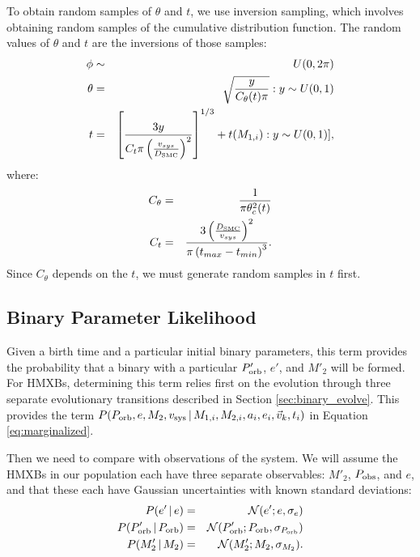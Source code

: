 \documentclass[usenatbib]{mnras}
\newcommand{\given}{\,|\,}
\begin{document}
 To obtain random samples of $\theta$ and $t$, we use inversion sampling, which involves obtaining random samples of the cumulative distribution function. The random values of $\theta$ and $t$ are the inversions of those samples:
 \begin{eqnarray}
\phi &\sim& U(0, 2\pi) \\
\theta &=& \sqrt{\frac{y}{C_{\theta}(t) \pi}}: y \sim U(0,1) \\
t &=& \left[ \frac{3y}{C_t \pi \left( \frac{v_{sys}}{D_{\rm SMC}} \right)^2} \right]^{1/3} + t(M_{1,i}): y \sim U(0,1)], 
\end{eqnarray}
where:
\begin{eqnarray}
C_{\theta} &=& \frac{1}{\pi \theta_c^2(t)} \\
C_t &=& \frac{ 3 \left( \frac{D_{\rm SMC}}{v_{sys}} \right)^2 }{ \pi \left( t_{max} - t_{min} \right)^3 }.
\end{eqnarray}
Since $C_{\theta}$ depends on the $t$, we must generate random samples in $t$ first. 





\subsection{Binary Parameter Likelihood} \label{sec:likelihood_ind_binary}

Given a birth time and a particular initial binary parameters, this term provides the probability that a binary with a particular $P'_{\rm orb}$, $e'$, and $M'_2$ will be formed. For HMXBs, determining this term relies first on the evolution through three separate evolutionary transitions described in Section \ref{sec:binary_evolve}. This provides the term $P(P_{\rm orb}, e, M_2, v_{\rm sys} \given M_{1,i}, M_{2,i}, a_i, e_i, \vec{v}_k, t_i)$ in Equation \ref{eq:marginalized}. 

Then we need to compare with observations of the system. We will assume the HMXBs in our population each have three separate observables: $M'_2$, $P_{\rm obs}$, and $e$, and that these each have Gaussian uncertainties with known standard deviations:
\begin{eqnarray}
P(e' \given e) &=& \mathcal{N}(e' ; e, \sigma_e) \\
P(P_{\rm orb}' \given P_{\rm orb}) &=& \mathcal{N}(P_{\rm orb}' ; P_{\rm orb}, \sigma_{P_{\rm orb}}) \\
P(M'_2 \given M_2) &=& \mathcal{N}(M'_2; M_2, \sigma_{M_2}).
\end{eqnarray}
\end{document}
